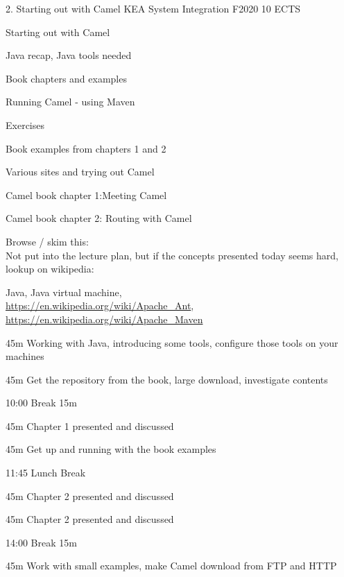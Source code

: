 \documentclass[Screen16to9,17pt]{foils}
\begin{document}
\mytitlepage
{2. Starting out with Camel}
{KEA System Integration F2020 10 ECTS}


Starting out with Camel
\begin{list2}
\item Java recap, Java tools needed
\item Book chapters and examples
\item Running Camel - using Maven
\end{list2}

Exercises
\begin{list2}
\item Book examples from chapters 1 and 2
\item Various sites and trying out Camel
\end{list2}




\begin{list1}
\item Camel book chapter 1:Meeting Camel
\item Camel book chapter 2: Routing with Camel
\item Browse / skim this:\\
Not put into the lecture plan, but if the concepts presented today seems hard, lookup on wikipedia:\\
\item Java, Java virtual machine,\\
 \url{https://en.wikipedia.org/wiki/Apache_Ant},\\ \url{https://en.wikipedia.org/wiki/Apache_Maven}
\end{list1}




\begin{list2}
\item 45m Working with Java, introducing some tools, configure those tools on your machines
\item 45m Get the repository from the book, large download, investigate contents
\item 10:00 Break 15m
\item 45m Chapter 1 presented and discussed
\item 45m Get up and running with the book examples
\item 11:45 Lunch Break
\item 45m Chapter 2 presented and discussed
\item 45m Chapter 2 presented and discussed
\item 14:00 Break 15m
\item 45m Work with small examples, make Camel download from FTP and HTTP
\end{list2}
\end{document}
